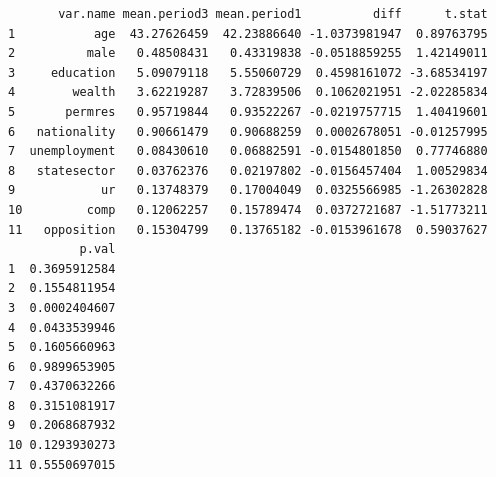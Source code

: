 \documentclass[
  letterpaper,
  DIV=11,
  numbers=noendperiod]{scrartcl}
\begin{document}
\begin{verbatim}
       var.name mean.period3 mean.period1          diff      t.stat
1           age  43.27626459  42.23886640 -1.0373981947  0.89763795
2          male   0.48508431   0.43319838 -0.0518859255  1.42149011
3     education   5.09079118   5.55060729  0.4598161072 -3.68534197
4        wealth   3.62219287   3.72839506  0.1062021951 -2.02285834
5       permres   0.95719844   0.93522267 -0.0219757715  1.40419601
6   nationality   0.90661479   0.90688259  0.0002678051 -0.01257995
7  unemployment   0.08430610   0.06882591 -0.0154801850  0.77746880
8   statesector   0.03762376   0.02197802 -0.0156457404  1.00529834
9            ur   0.13748379   0.17004049  0.0325566985 -1.26302828
10         comp   0.12062257   0.15789474  0.0372721687 -1.51773211
11   opposition   0.15304799   0.13765182 -0.0153961678  0.59037627
          p.val
1  0.3695912584
2  0.1554811954
3  0.0002404607
4  0.0433539946
5  0.1605660963
6  0.9899653905
7  0.4370632266
8  0.3151081917
9  0.2068687932
10 0.1293930273
11 0.5550697015
\end{verbatim}
\end{document}

